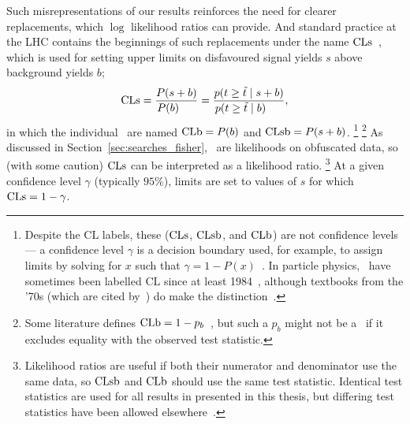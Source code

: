 Such misrepresentations of our results reinforces the need for clearer
replacements, which $\log$ likelihood ratios can provide.
And standard practice at the LHC contains the beginnings of such
replacements under the name $\mathrm{CLs}$~\cite{
read2000modified,
Read2002cls,
junk1999confidence,
read1997optimal,
bock1998lower,
etde1998prospects,
lep2000searches,
lep2003search,
Murray2010heretic,
CMS-NOTE-2011-005,
pdg2022ynf
},
which is used for setting upper limits on disfavoured signal yields $s$
above background yields $b$;
\begin{equation}
\label{eqn:searches_cls}
\mathrm{CLs}
=
\frac{P(s + b)}{P(b)\hphantom{s +\;}}
=
\frac{
p(t \geq \tilde{t} \mid s + b)
}{
p(t \geq \tilde{t} \mid b)\hphantom{s +\;}
}
,
\end{equation}
in which the individual \pvalues\ are named
$\mathrm{CLb} = P(b)$ and
$\mathrm{CLsb} = P(s + b)$.%
\footnote{%
Despite the $\mathrm{CL}$ labels, these ($\mathrm{CLs}$, $\mathrm{CLsb}$, and $\mathrm{CLb}$) are
not confidence levels ---
a confidence level $\gamma$ is a decision boundary used, for example,
to assign limits by solving for $x$ such that
$\gamma = 1 - P(x)$~\cite{pdg1996}.
In particle physics, \pvalues\ have sometimes been labelled $\mathrm{CL}$ since
at least 1984~\cite{pdg1984}, although textbooks from the '70s (which are cited
by~\cite{pdg1984}) do make the distinction~\cite{
eadie1971statistical,
frodesen1979probability
}.%
}%
\footnote{%
Some literature defines $\mathrm{CLb} = 1 - p_b$~\cite{
Cowan:2010js,
pdg2022ynf
}, but such a $p_b$ might not be a \pvalue\ if it excludes equality with the
observed test statistic.
}%
As discussed in Section~\ref{sec:searches_fisher}, \pvalues\ are likelihoods
on obfuscated data, so (with some caution) $\mathrm{CLs}$ can be interpreted as a
likelihood ratio.%
\footnote{%
Likelihood ratios are useful if both their numerator and denominator use the
same data, so $\mathrm{CLsb}$ and $\mathrm{CLb}$ should use the same test statistic.
Identical test statistics are used for all results in presented in this thesis,
but differing test statistics have been allowed elsewhere~\cite{bock1998lower}.
}%
At a given confidence level $\gamma$ (typically $95\%$), limits are set to
values of $s$ for which $\mathrm{CLs} = 1 - \gamma$.

